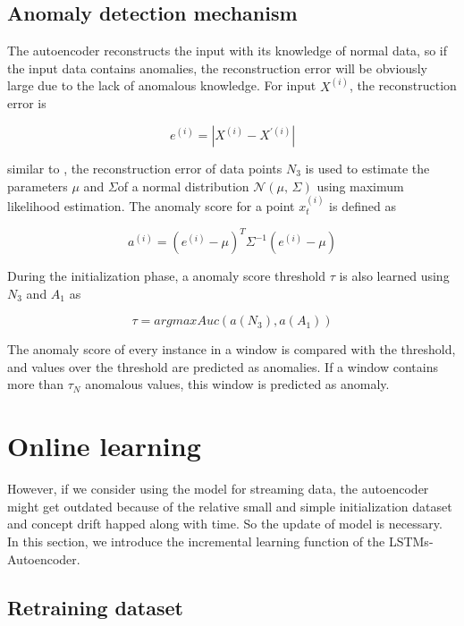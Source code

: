 \subsection{Anomaly detection mechanism}
\label{anomalydetection}
The autoencoder reconstructs the input with its knowledge of normal data, so if the input data contains anomalies, the reconstruction error will be obviously large due to the lack of anomalous knowledge. For input $X^{(i)}$, the reconstruction error is 

\begin{equation} \label{eq:error}
e^{(i)}=\left| X^{(i)} - X^{'(i)} \right|
\end{equation}

similar to \cite{encdecad}, the reconstruction error of data points $N_3$ is used to estimate the parameters $\mu$ and $\Sigma$of a normal distribution $\mathcal{N}(\mu,\,\Sigma)$ using maximum likelihood estimation. The anomaly score for a point $x_t^{(i)}$ is defined as 

\begin{equation} \label{eq:score}
a^{(i)}={(e^{(i)}-\mu)}^{T}{\Sigma}^{-1}{(e^{(i)}-\mu)}
\end{equation}

During the initialization phase, a anomaly score threshold $\tau$ is also learned using $N_3$ and $A_1$ as

\begin{equation} \label{eq:threshold}
\tau = argmax Auc(a(N_3),a(A_1))
\end{equation}

The anomaly score of every instance in a window is compared with the threshold, and values over the threshold are predicted as anomalies. If a window contains more than $\tau_N$ anomalous values, this window is predicted as anomaly.




\section{Online learning}
\label{sec:Onlinelearning}
However, if we consider using the model for streaming data, the autoencoder might get outdated because of the relative small and simple initialization dataset and concept drift happed along with time. So the update of model is necessary. In this section, we introduce the incremental learning function of the LSTMs-Autoencoder.

\subsection{Retraining dataset}
\label{data}

